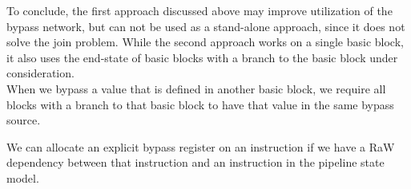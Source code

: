 To conclude, the first approach discussed above may improve utilization of the bypass network, but can not be used as a stand-alone approach, since it does not solve the join problem. While the second approach works on a single basic block, it also uses the end-state of basic blocks with a branch to the basic block under consideration.\\

When we bypass a value that is defined in another basic block, we require all blocks with a branch to that basic block to have that value in the same bypass source.






We can allocate an explicit bypass register on an instruction if we have a RaW dependency between that instruction and an instruction in the pipeline state model. 

